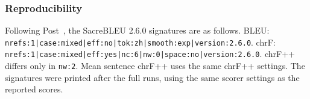 \subsubsection{Reproducibility}
Following Post~\cite{post2018clarity}, the SacreBLEU 2.6.0
signatures are as follows. BLEU:
\texttt{nrefs:1\allowbreak|case:mixed\allowbreak|eff:no\allowbreak|tok:zh\allowbreak|smooth:exp\allowbreak|version:2.6.0}.
chrF:
\texttt{nrefs:1\allowbreak|case:mixed\allowbreak|eff:yes\allowbreak|nc:6\allowbreak|nw:0\allowbreak|space:no\allowbreak|version:2.6.0}.
chrF++ differs only in \texttt{nw:2}. Mean sentence chrF++ uses the same
chrF++ settings. The signatures were printed after the full runs, using
the same scorer settings as the reported scores.
